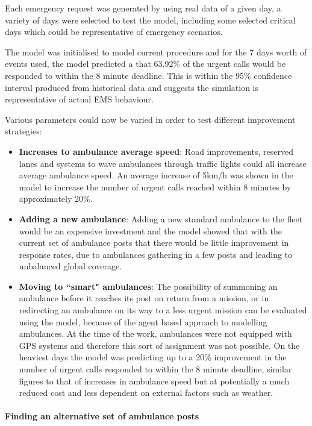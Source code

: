 \documentclass[11pt]{article} %
\begin{document}
Each emergency request was generated by using real data of a given day, a variety of days were selected to test the model, including some selected critical days which could be representative of emergency scenarios. 

The model was initialised to model current procedure and for the 7 days worth of events used, the model predicted a that 63.92\% of the urgent calls would be responded to within the 8 minute deadline. This is within the 95\% confidence interval produced from historical data and suggests the simulation is representative of actual EMS behaviour. 

Various parameters could now be varied in order to test different improvement strategies:
\begin{itemize}
	\item \textbf{Increases to  ambulance average speed}: Road improvements, reserved lanes and systems to wave ambulances through traffic lights could all increase average ambulance speed. An average increase of 5km/h was shown in the model to increase the number of urgent calls reached within 8 minutes by approximately 20\%.
	\item \textbf{Adding a new ambulance}:  Adding a new standard ambulance to the fleet would be an expensive investment and the model showed that with the current set of ambulance posts that there would be little improvement in response rates, due to ambulances gathering in a few posts and leading to unbalanced global coverage. 
	\item \textbf{Moving to ``smart" ambulances}: The possibility of summoning an ambulance before it reaches its post on return from a mission, or in redirecting an ambulance on its way to a less urgent mission can be evaluated using the model, because of the agent based approach to modelling ambulances. At the time of the work, ambulances were not equipped with GPS systems and therefore this sort of assignment was not possible. On the heaviest days the model was predicting up to a 20\% improvement in the number of urgent calls responded to within the 8 minute deadline, similar figures to that of increases in ambulance speed but at potentially a much reduced cost and less dependent on external factors such as weather. 
\end{itemize}

\paragraph{Finding an alternative set of ambulance posts}
\end{document}

